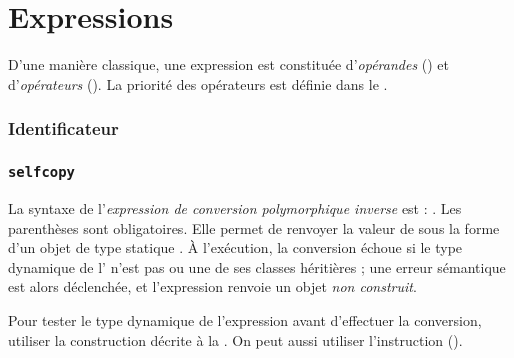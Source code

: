 
\chapter{Expressions}

D'une manière classique, une expression est constituée d'\emph{opérandes} () et d'\emph{opérateurs} (). La priorité des opérateurs est définie dans le .





\subsection{Identificateur}

\subsection{\texttt{selfcopy}}



La syntaxe de l'\emph{expression de conversion polymorphique inverse} est : . Les parenthèses sont obligatoires. Elle permet de renvoyer la valeur de  sous la forme d'un objet de type statique . À l'exécution, la conversion échoue si le type dynamique de l' n'est pas  ou une de ses classes héritières ; une erreur sémantique est alors déclenchée, et l'expression renvoie un objet \emph{non construit}.

Pour tester le type dynamique de l'expression avant d'effectuer la conversion, utiliser la construction décrite à la . On peut aussi utiliser l'instruction  ().


